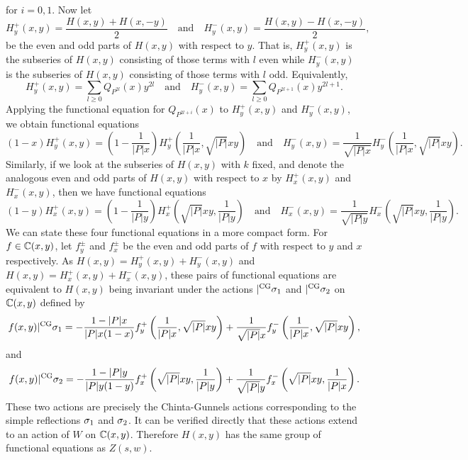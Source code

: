 \documentclass[12pt,reqno,oneside]{amsart}
\begin{document}
    for $i = 0,1$. Now let
    \[
        H_{y}^{+}(x,y) = \frac{H(x,y)+H(x,-y)}{2} \quad \text{and} \quad H_{y}^{-}(x,y) = \frac{H(x,y)-H(x,-y)}{2},
    \]
    be the even and odd parts of $H(x,y)$ with respect to $y$. That is, $H_{y}^{+}(x,y)$ is the subseries of $H(x,y)$ consisting of those terms with $l$ even while $H_{y}^{-}(x,y)$ is the subseries of $H(x,y)$ consisting of those terms with $l$ odd. Equivalently,
    \[
        H_{y}^{+}(x,y) = \sum_{l \ge 0}Q_{P^{2l}}(x)y^{2l} \quad \text{and} \quad H_{y}^{-}(x,y) = \sum_{l \ge 0}Q_{P^{2l+1}}(x)y^{2l+1}.
    \]
    Applying the functional equation for $Q_{P^{2l+i}}(x)$ to $H_{y}^{+}(x,y)$ and $H_{y}^{-}(x,y)$, we obtain functional equations
    \[
        (1-x)H_{y}^{+}(x,y) = \left(1-\frac{1}{|P|x}\right)H_{y}^{+}\left(\frac{1}{|P|x},\sqrt{|P|}xy\right) \quad \text{and} \quad H_{y}^{-}(x,y) = \frac{1}{\sqrt{|P|x}}H_{y}^{-}\left(\frac{1}{|P|x},\sqrt{|P|}xy\right).
    \]
    Similarly, if we look at the subseries of $H(x,y)$ with $k$ fixed, and denote the analogous even and odd parts of $H(x,y)$ with respect to $x$ by $H_{x}^{+}(x,y)$ and $H_{x}^{-}(x,y)$, then we have functional equations
    \[
        (1-y)H_{x}^{+}(x,y) = \left(1-\frac{1}{|P|y}\right)H_{x}^{+}\left(\sqrt{|P|}xy,\frac{1}{|P|y}\right) \quad \text{and} \quad H_{x}^{-}(x,y) = \frac{1}{\sqrt{|P|y}}H_{x}^{-}\left(\sqrt{|P|}xy,\frac{1}{|P|y}\right).
    \]
    We can state these four functional equations in a more compact form. For $f \in \mathbb{C}(x,y)$, let $f_{y}^{\pm}$ and $f_{x}^{\pm}$ be the even and odd parts of $f$ with respect to $y$ and $x$ respectively. As $H(x,y) = H_{y}^{+}(x,y)+H_{y}^{-}(x,y)$ and $H(x,y) = H_{x}^{+}(x,y)+H_{x}^{-}(x,y)$, these pairs of functional equations are equivalent to $H(x,y)$ being invariant under the actions $|^{\mathrm{CG}}\sigma_{1}$ and $|^{\mathrm{CG}}\sigma_{2}$ on $\mathbb{C}(x,y)$ defined by
    \[
        f(x,y)|^{\mathrm{CG}}\sigma_{1} = -\frac{1-|P|x}{|P|x(1-x)}f_{y}^{+}\left(\frac{1}{|P|x},\sqrt{|P|}xy\right)+\frac{1}{\sqrt{|P|}x}f_{y}^{-}\left(\frac{1}{|P|x},\sqrt{|P|}xy\right),
    \]
    and
    \[
        f(x,y)|^{\mathrm{CG}}\sigma_{2} = -\frac{1-|P|y}{|P|y(1-y)}f_{x}^{+}\left(\sqrt{|P|}xy,\frac{1}{|P|y}\right)+\frac{1}{\sqrt{|P|}y}f_{x}^{-}\left(\sqrt{|P|}xy,\frac{1}{|P|x}\right).
    \]
    These two actions are precisely the Chinta-Gunnels actions corresponding to the simple reflections $\sigma_{1}$ and $\sigma_{2}$. It can be verified directly that these actions extend to an action of $W$ on $\mathbb{C}(x,y)$. Therefore $H(x,y)$ has the same group of functional equations as $Z(s,w)$.

    
    
\end{document}
